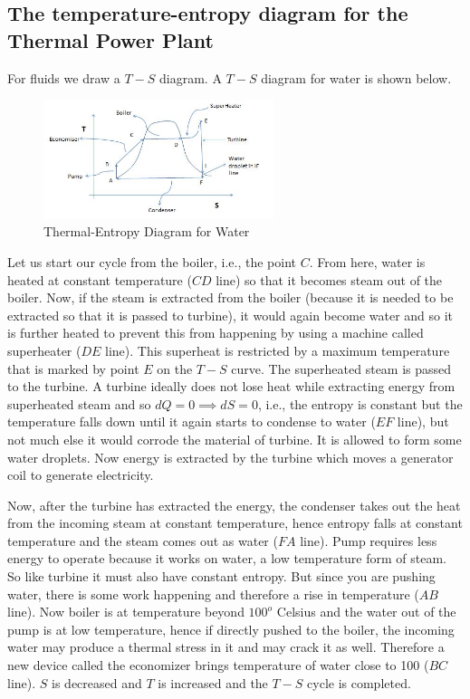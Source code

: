 \documentclass{report}
\begin{document}
\subsection{The temperature-entropy diagram for the Thermal Power Plant}
For fluids we draw a $T-S$ diagram. A $T-S$ diagram for water is shown below. 
\\
\begin{figure}[H]
\centering \includegraphics[width=0.6\textwidth]{captures/Capture2.JPG}
\caption{Thermal-Entropy Diagram for Water}
\end{figure}
\par Let us start our cycle from the boiler, i.e., the point $C$. From here, water is heated at constant temperature ($CD$ line) so that it becomes steam out of the boiler. Now, if the steam is extracted from the boiler (because it is needed to be extracted so that it is passed to turbine), it would again become water and so it is further heated to prevent this from happening by using a machine called superheater ($DE$ line). This superheat is restricted by a maximum temperature that is marked by point $E$ on the $T-S$ curve.  The superheated steam is passed to the turbine. A turbine ideally does not lose heat while extracting energy from superheated steam and so $dQ = 0 \implies dS = 0$, i.e., the entropy is constant but the temperature falls down until it again starts to condense to water ($EF$ line), but not much else it would corrode the material of turbine. It is allowed to form some water droplets. Now energy is extracted by the turbine which moves a generator coil to generate electricity.

\par Now, after the turbine has extracted the energy, the condenser takes out the heat from the incoming steam at constant temperature, hence entropy falls at constant temperature and the steam comes out as water ($FA$ line). Pump requires less energy to operate because it works on water, a low temperature form of steam. So like turbine it must also have constant entropy. But since you are pushing water, there is some work happening and therefore a rise in temperature ($AB$ line). Now boiler is at temperature beyond $100^{o}$ Celsius and the water out of the pump is at low temperature, hence if directly pushed to the boiler, the incoming water may produce a thermal stress in it and may crack it as well.  Therefore a new device called the economizer brings temperature of water close to 100 ($BC$ line). $S$ is decreased and $T$ is increased and the $T-S$ cycle is completed.
\end{document}
